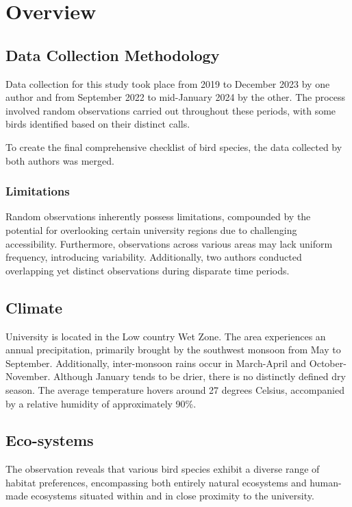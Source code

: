 \chapter{Overview}
\label{cp:overview}
\section{Data Collection Methodology}
Data collection for this study took place from 2019 to December 2023 by one author and from September 2022 to mid-January 2024 by the other. The process involved random observations carried out throughout these periods, with some birds identified based on their distinct calls.

To create the final comprehensive checklist of bird species, the data collected by both authors was merged.

\begin{importantbox}
\subsection{Limitations}
 Random observations inherently possess limitations, compounded by the potential for overlooking certain university regions due to challenging accessibility. Furthermore, observations across various areas may lack uniform frequency, introducing variability. Additionally, two authors conducted overlapping yet distinct observations during disparate time periods.
\end{importantbox}

\section{Climate}
University is located in the Low country Wet Zone. The area experiences an annual precipitation, primarily brought by the southwest monsoon from May to September. Additionally, inter-monsoon rains occur in March-April and October-November. Although January tends to be drier, there is no distinctly defined dry season. The average temperature hovers around 27 degrees Celsius, accompanied by a relative humidity of approximately 90\%.

\section{Eco-systems}
The observation reveals that various bird species exhibit a diverse range of habitat preferences, encompassing both entirely natural ecosystems and human-made ecosystems situated within and in close proximity to the university.

